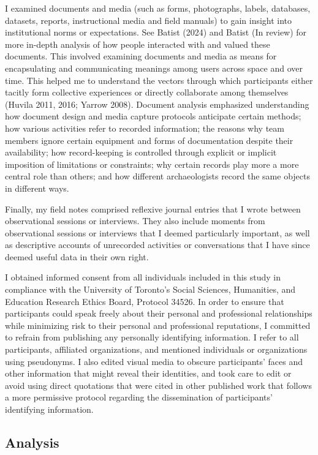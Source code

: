 \documentclass[
]{article}
\begin{document}
I examined documents and media (such as forms, photographs, labels,
databases, datasets, reports, instructional media and field manuals) to
gain insight into institutional norms or expectations. See Batist (2024)
and Batist (In review) for more in-depth analysis of how people
interacted with and valued these documents. This involved examining
documents and media as means for encapsulating and communicating
meanings among users across space and over time. This helped me to
understand the vectors through which participants either tacitly form
collective experiences or directly collaborate among themselves (Huvila
2011, 2016; Yarrow 2008). Document analysis emphasized understanding how
document design and media capture protocols anticipate certain methods;
how various activities refer to recorded information; the reasons why
team members ignore certain equipment and forms of documentation despite
their availability; how record-keeping is controlled through explicit or
implicit imposition of limitations or constraints; why certain records
play more a more central role than others; and how different
archaeologists record the same objects in different ways.

Finally, my field notes comprised reflexive journal entries that I wrote
between observational sessions or interviews. They also include moments
from observational sessions or interviews that I deemed particularly
important, as well as descriptive accounts of unrecorded activities or
conversations that I have since deemed useful data in their own right.

I obtained informed consent from all individuals included in this study
in compliance with the University of Toronto's Social Sciences,
Humanities, and Education Research Ethics Board, Protocol 34526. In
order to ensure that participants could speak freely about their
personal and professional relationships while minimizing risk to their
personal and professional reputations, I committed to refrain from
publishing any personally identifying information. I refer to all
participants, affiliated organizations, and mentioned individuals or
organizations using pseudonyms. I also edited visual media to obscure
participants' faces and other information that might reveal their
identities, and took care to edit or avoid using direct quotations that
were cited in other published work that follows a more permissive
protocol regarding the dissemination of participants' identifying
information.

\subsection{Analysis}\label{analysis}
\end{document}
